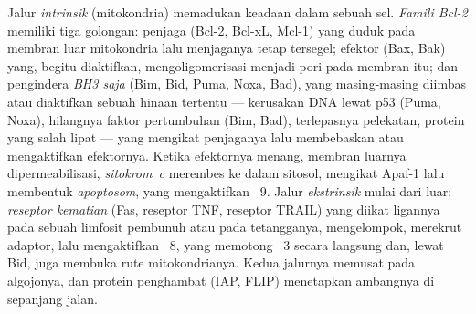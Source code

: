 \begin{definition}\label{def:b3:cell-cycle-apoptosis:pathways}
%
Jalur \emph{intrinsik} (mitokondria) memadukan keadaan dalam sebuah sel.
\emph{Famili Bcl-2} memiliki tiga golongan: penjaga
(Bcl-2, Bcl-xL, Mcl-1) yang duduk pada membran luar mitokondria lalu
menjaganya tetap tersegel; efektor (Bax, Bak) yang, begitu diaktifkan,
mengoligomerisasi menjadi pori pada membran itu; dan pengindera \emph{BH3
saja} (Bim, Bid, Puma, Noxa, Bad), yang masing-masing diimbas atau diaktifkan
sebuah hinaan tertentu --- kerusakan DNA lewat p53 (Puma, Noxa), hilangnya
faktor pertumbuhan (Bim, Bad), terlepasnya pelekatan, protein yang salah
lipat --- yang mengikat penjaganya lalu membebaskan atau mengaktifkan
efektornya. Ketika efektornya menang, membran luarnya dipermeabilisasi,
\emph{sitokrom~c} merembes ke dalam sitosol, mengikat Apaf-1 lalu membentuk
\emph{apoptosom}, yang mengaktifkan ~9. Jalur
\emph{ekstrinsik} mulai dari luar: \emph{reseptor kematian} (Fas,
reseptor TNF, reseptor TRAIL) yang diikat ligannya pada sebuah limfosit
pembunuh atau pada tetangganya, mengelompok, merekrut adaptor, lalu
mengaktifkan ~8, yang memotong ~3 secara langsung dan, lewat
Bid, juga membuka rute mitokondrianya. Kedua jalurnya memusat pada
 algojonya, dan protein penghambat (IAP, FLIP) menetapkan
ambangnya di sepanjang jalan.
\end{definition}

